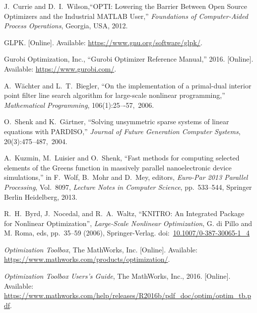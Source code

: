 \documentclass[12pt]{article}
\numberwithin{equation}{section}
\numberwithin{table}{section}
\numberwithin{figure}{section}
\begin{document}
\begin{thebibliography}{99}
J.~Currie and D.~I.~Wilson,``OPTI: Lowering the Barrier Between Open Source Optimizers and the Industrial MATLAB User,'' \emph{Foundations of Computer-Aided Process Operations}, Georgia, USA, 2012.

GLPK. [Online]. Available:
  \url{https://www.gnu.org/software/glpk/}.

Gurobi Optimization, Inc., ``Gurobi Optimizer Reference Manual,'' 2016. [Online]. Available:
  \url{https://www.gurobi.com/}.

A.~W\"achter and L.~T.~Biegler, ``On the implementation of a primal-dual interior point filter line search algorithm for large-scale nonlinear programming,'' \emph{Mathematical Programming}, 106(1):25–-57,~2006.

O.~Shenk and K.~G\"artner, ``Solving unsymmetric sparse systems of linear equations with PARDISO,'' \emph{Journal of Future Generation Computer Systems}, 20(3):475--487,~2004.

A.~Kuzmin, M.~Luisier and O.~Shenk, ``Fast methods for computing selected elements of the Greens function in massively parallel nanoelectronic device simulations,'' in F.~Wolf, B.~Mohr and D.~Mey, editors, \emph{Euro-Par 2013 Parallel Processing}, Vol.~8097, \emph{Lecture Notes in Computer Science}, pp.~533--544, Springer Berlin Heidelberg, 2013.

R.~H.~Byrd, J.~Nocedal, and R.~A.~Waltz, ``KNITRO: An Integrated Package for Nonlinear Optimization'', \emph{Large-Scale Nonlinear Optimization}, G. di Pillo and M. Roma, eds, pp.~35--59 (2006), Springer-Verlag.
doi:~\href{https://doi.org/10.1007/0-387-30065-1_4}{10.1007/0-387-30065-1\_4}

\emph{Optimization Toolbox}, The MathWorks, Inc.
  [Online]. Available: \url{https://www.mathworks.com/products/optimization/}.

\emph{Optimization Toolbox Users's Guide}, The MathWorks, Inc., 2016.
  [Online]. Available: \url{https://www.mathworks.com/help/releases/R2016b/pdf_doc/optim/optim_tb.pdf}.

\end{thebibliography}
\end{document}
